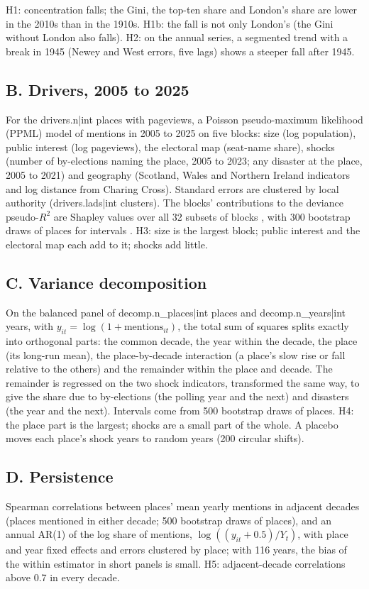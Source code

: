 \documentclass[11pt,a4paper]{article}
\begin{document}
H1: concentration falls; the Gini, the top-ten share and London's share are lower in the 2010s than in the 1910s. H1b: the fall is not only London's (the Gini without London also falls). H2: on the annual series, a segmented trend with a break in 1945 (Newey and West errors, five lags) shows a steeper fall after 1945.

\subsection{B. Drivers, 2005 to 2025}
For the {{drivers.n|int}} places with pageviews, a Poisson pseudo-maximum likelihood (PPML) model \citep{santossilva2006} of mentions in 2005 to 2025 on five blocks: size (log population), public interest (log pageviews), the electoral map (seat-name share), shocks (number of by-elections naming the place, 2005 to 2023; any disaster at the place, 2005 to 2021) and geography (Scotland, Wales and Northern Ireland indicators and log distance from Charing Cross). Standard errors are clustered by local authority ({{drivers.lads|int}} clusters). The blocks' contributions to the deviance pseudo-$R^2$ are Shapley values over all 32 subsets of blocks \citep{israeli2007}, with 300 bootstrap draws of places for intervals \citep{efron1993}. H3: size is the largest block; public interest and the electoral map each add to it; shocks add little.

\subsection{C. Variance decomposition}
On the balanced panel of {{decomp.n_places|int}} places and {{decomp.n_years|int}} years, with $y_{it} = \log(1 + \text{mentions}_{it})$, the total sum of squares splits exactly into orthogonal parts: the common decade, the year within the decade, the place (its long-run mean), the place-by-decade interaction (a place's slow rise or fall relative to the others) and the remainder within the place and decade. The remainder is regressed on the two shock indicators, transformed the same way, to give the share due to by-elections (the polling year and the next) and disasters (the year and the next). Intervals come from 500 bootstrap draws of places. H4: the place part is the largest; shocks are a small part of the whole. A placebo moves each place's shock years to random years (200 circular shifts).

\subsection{D. Persistence}
Spearman correlations between places' mean yearly mentions in adjacent decades (places mentioned in either decade; 500 bootstrap draws of places), and an annual AR(1) of the log share of mentions, $\log((y_{it}+0.5)/Y_t)$, with place and year fixed effects and errors clustered by place; with 116 years, the bias of the within estimator in short panels \citep{nickell1981} is small. H5: adjacent-decade correlations above 0.7 in every decade.
\end{document}
